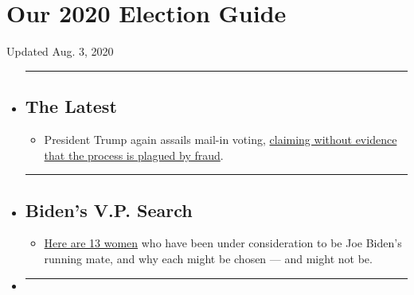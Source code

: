 \hypertarget{our-2020-election-guide}{%
\section{Our 2020 Election Guide}\label{our-2020-election-guide}}

Updated Aug. 3, 2020

\begin{itemize}
\item
  \begin{center}\rule{0.5\linewidth}{\linethickness}\end{center}

  \hypertarget{the-latest}{%
  \subsection{The Latest}\label{the-latest}}

  \begin{itemize}
  \tightlist
  \item
    President Trump again assails mail-in voting,
    \href{https://www.nytimes.com/2020/08/03/us/politics/trump-mail-in-voting.html?action=click\&pgtype=Article\&state=default\&region=BELOW_MAIN_CONTENT\&context=storylines_guide}{claiming
    without evidence that the process is plagued by fraud}.
  \end{itemize}
\item
  \begin{center}\rule{0.5\linewidth}{\linethickness}\end{center}

  \hypertarget{bidens-vp-search}{%
  \subsection{Biden's V.P. Search}\label{bidens-vp-search}}

  \begin{itemize}
  \tightlist
  \item
    \href{https://www.nytimes.com/article/biden-vice-president-2020.html?action=click\&pgtype=Article\&state=default\&region=BELOW_MAIN_CONTENT\&context=storylines_guide}{Here
    are 13 women} who have been under consideration to be Joe Biden's
    running mate, and why each might be chosen --- and might not be.
  \end{itemize}
\item
  \begin{center}\rule{0.5\linewidth}{\linethickness}\end{center}


\end{itemize}
